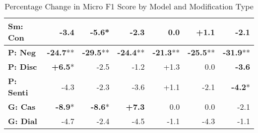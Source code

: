 \begin{table}[h]
\begin{tabular}{lrrrrrr}
\textbf{Sm: Con} & \cellcolor{red!10} -3.4 & \cellcolor{red!16} \textbf{-5.6}* & \cellcolor{red!6} -2.3 & \cellcolor{red!0} 0.0 & \cellcolor{green!3} +1.1 & \cellcolor{red!6} -2.1 \\
\hline
\textbf{P: Neg} & \cellcolor{red!30} \textbf{-24.7}** & \cellcolor{red!30} \textbf{-29.5}** & \cellcolor{red!30} \textbf{-24.4}** & \cellcolor{red!30} \textbf{-21.3}** & \cellcolor{red!30} \textbf{-25.5}** & \cellcolor{red!30} \textbf{-31.9}** \\
\textbf{P: Disc} & \cellcolor{green!19} \textbf{+6.5}* & \cellcolor{red!7} -2.5 & \cellcolor{red!3} -1.2 & \cellcolor{green!3} +1.3 & \cellcolor{red!0} 0.0 & \cellcolor{red!10} \textbf{-3.6} \\
\textbf{P: Senti} & \cellcolor{red!12} -4.3 & \cellcolor{red!6} -2.3 & \cellcolor{red!10} -3.6 & \cellcolor{green!3} +1.1 & \cellcolor{red!6} -2.1 & \cellcolor{red!12} \textbf{-4.2}* \\
\hline
\textbf{G: Cas} & \cellcolor{red!26} \textbf{-8.9}* & \cellcolor{red!25} \textbf{-8.6}* & \cellcolor{green!21} \textbf{+7.3} & \cellcolor{red!0} 0.0 & \cellcolor{red!0} 0.0 & \cellcolor{red!6} -2.1 \\
\textbf{G: Dial} & \cellcolor{red!14} -4.7 & \cellcolor{red!7} -2.4 & \cellcolor{red!13} -4.5 & \cellcolor{red!3} -1.1 & \cellcolor{red!12} -4.3 & \cellcolor{red!3} -1.1 \\
\hline
\end{tabular}
\caption{Percentage Change in Micro F1 Score by Model and Modification Type}
\label{tab:ner_results}
\end{table}